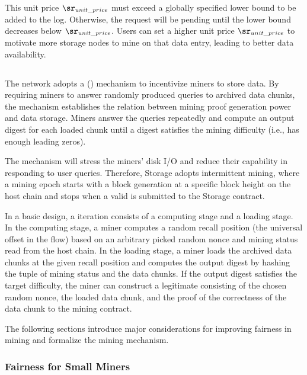 This unit price $\sr_{unit\_price}$ must exceed a globally specified lower bound to be added to the log. Otherwise, the request will be pending until the lower bound decreases below $\sr_{unit\_price}$. Users can set a higher unit price $\sr_{unit\_price}$ to motivate more storage nodes to mine on that data entry, leading to better data availability.

\subsection{\proof}

The \project network adopts a \proof (\sproof) mechanism to incentivize miners to store data. By requiring miners to answer randomly produced queries to archived data chunks, the \sproof mechanism establishes the relation between mining proof generation power and data storage. Miners answer the queries repeatedly and compute an output digest for each loaded chunk until a digest satisfies the mining difficulty (i.e., has enough leading zeros). 

The {\sproof} mechanism will stress the miners' disk I/O and reduce their capability in responding to user queries. Therefore, \projabbrev Storage adopts intermittent mining, where a mining epoch starts with a block generation at a specific block height on the host chain and stops when a valid {\sproof} is submitted to the \projabbrev Storage contract.

In a basic design, a \sproof iteration consists of a computing stage and a loading stage. In the computing stage, a miner computes a random recall position (the universal offset in the flow) based on an arbitrary picked random nonce and mining status read from the host chain. In the loading stage, a miner loads the archived data chunks at the given recall position and computes the output digest by hashing the tuple of mining status and the data chunks. If the output digest satisfies the target difficulty, the miner can construct a legitimate \sproof consisting of the chosen random nonce, the loaded data chunk, and the proof of the correctness of the data chunk to the mining contract.

The following sections introduce major considerations for improving fairness in {\sproof} mining and formalize the {\sproof} mining mechanism.

\subsubsection{Fairness for Small Miners}

